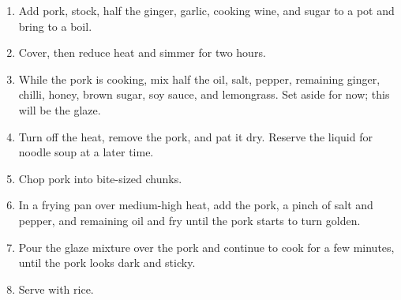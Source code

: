 \begin{enumerate}
	\item Add pork, stock, half the ginger, garlic, cooking wine, and sugar to a pot and bring to a boil.
	\item Cover, then reduce heat and simmer for two hours.
	\item While the pork is cooking, mix half the oil, salt, pepper, remaining ginger, chilli, honey, brown sugar, soy sauce, and lemongrass. Set aside for now; this will be the glaze.
	\item Turn off the heat, remove the pork, and pat it dry. Reserve the liquid for noodle soup at a later time.
	\item Chop pork into bite-sized chunks.
	\item In a frying pan over medium-high heat, add the pork, a pinch of salt and pepper, and remaining oil and fry until the pork starts to turn golden.
	\item Pour the glaze mixture over the pork and continue to cook for a few minutes, until the pork looks dark and sticky.
	\item Serve with rice.
\end{enumerate}
